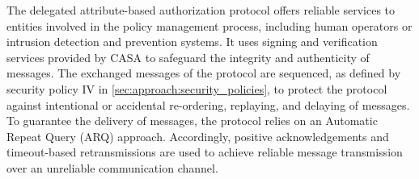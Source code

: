 The delegated attribute-based authorization protocol offers reliable services to entities involved in the policy management process, including human operators or intrusion detection and prevention systems. 
It uses signing and verification services provided by CASA to safeguard the integrity and authenticity of messages.
The exchanged messages of the protocol are sequenced, as defined by security policy IV in \autoref{sec:approach:security_policies}, to protect the protocol against intentional or accidental re-ordering, replaying, and delaying of messages.
To guarantee the delivery of messages, the protocol relies on an Automatic Repeat Query (ARQ) approach.
Accordingly, positive acknowledgements and timeout-based retransmissions are used to achieve reliable message transmission over an unreliable communication channel.

